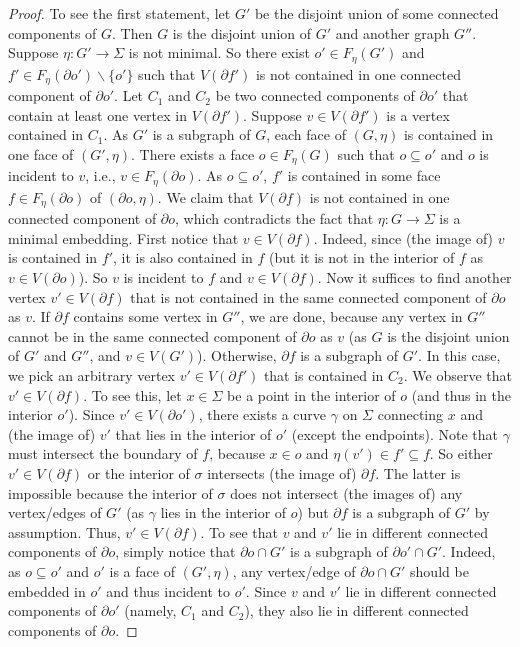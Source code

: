 \documentclass[a4paper,11pt]{article}
\numberwithin{lemma}{section}
\begin{document}
\begin{proof}
To see the first statement, let $G'$ be the disjoint union of some connected components of $G$.
Then $G$ is the disjoint union of $G'$ and another graph $G''$.
Suppose $\eta\colon G' \rightarrow \varSigma$ is not minimal.
So there exist $o' \in F_\eta(G')$ and $f' \in F_\eta(\partial o') \backslash \{o'\}$ such that $V(\partial f')$ is not contained in one connected component of $\partial o'$.
Let $C_1$ and $C_2$ be two connected components of $\partial o'$ that contain at least one vertex in $V(\partial f')$.
Suppose $v \in V(\partial f')$ is a vertex contained in $C_1$.
As $G'$ is a subgraph of $G$, each face of $(G,\eta)$ is contained in one face of $(G',\eta)$.
There exists a face $o \in F_\eta(G)$ such that $o \subseteq o'$ and $o$ is incident to $v$, i.e., $v \in F_\eta(\partial o)$.
As $o \subseteq o'$, $f'$ is contained in some face $f \in F_\eta(\partial o)$ of $(\partial o, \eta)$.
We claim that $V(\partial f)$ is not contained in one connected component of $\partial o$, which contradicts the fact that $\eta\colon G \rightarrow \varSigma$ is a minimal embedding.
First notice that $v \in V(\partial f)$.
Indeed, since (the image of) $v$ is contained in $f'$, it is also contained in $f$ (but it is not in the interior of $f$ as $v \in V(\partial o)$).
So $v$ is incident to $f$ and $v \in V(\partial f)$.
Now it suffices to find another vertex $v' \in V(\partial f)$ that is not contained in the same connected component of $\partial o$ as $v$.
If $\partial f$ contains some vertex in $G''$, we are done, because any vertex in $G''$ cannot be in the same connected component of $\partial o$ as $v$ (as $G$ is the disjoint union of $G'$ and $G''$, and $v \in V(G')$).
Otherwise, $\partial f$ is a subgraph of $G'$.
In this case, we pick an arbitrary vertex $v' \in V(\partial f')$ that is contained in $C_2$.
We observe that $v' \in V(\partial f)$.
To see this, let $x \in \varSigma$ be a point in the interior of $o$ (and thus in the interior $o'$).
Since $v' \in V(\partial o')$, there exists a curve $\gamma$ on $\varSigma$ connecting $x$ and (the image of) $v'$ that lies in the interior of $o'$ (except the endpoints).
Note that $\gamma$ must intersect the boundary of $f$, because $x \in o$ and $\eta(v') \in f' \subseteq f$.
So either $v' \in V(\partial f)$ or the interior of $\sigma$ intersects (the image of) $\partial f$.
The latter is impossible because the interior of $\sigma$ does not intersect (the images of) any vertex/edges of $G'$ (as $\gamma$ lies in the interior of $o$) but $\partial f$ is a subgraph of $G'$ by assumption.
Thus, $v' \in V(\partial f)$.
To see that $v$ and $v'$ lie in different connected components of $\partial o$, simply notice that $\partial o \cap G'$ is a subgraph of $\partial o' \cap G'$.
Indeed, as $o \subseteq o'$ and $o'$ is a face of $(G',\eta)$, any vertex/edge of $\partial o \cap G'$ should be embedded in $o'$ and thus incident to $o'$.
Since $v$ and $v'$ lie in different connected components of $\partial o'$ (namely, $C_1$ and $C_2$), they also lie in different connected components of $\partial o$.


\end{proof}
\end{document}
